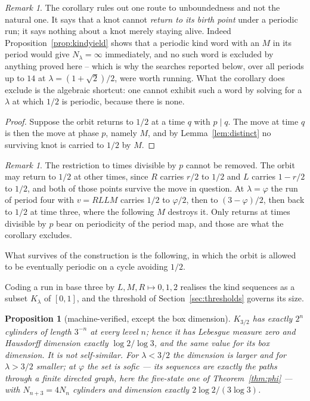 \documentclass[11pt,reqno]{amsart}
\theoremstyle{plain}
\newtheorem{proposition}[theorem]{Proposition}
\theoremstyle{definition}
\theoremstyle{remark}
\newtheorem{remark}[theorem]{Remark}
\begin{document}
\begin{remark}
The corollary rules out one route to unboundedness and not the natural one. It
says that a knot cannot \emph{return to its birth point} under a periodic run;
it says nothing about a knot merely staying alive. Indeed
Proposition~\ref{prop:kindyield} shows that a periodic kind word with an $M$ in
its period would give $N_\lambda=\infty$ immediately, and no such word is
excluded by anything proved here -- which is why the searches reported below,
over all periods up to $14$ at $\lambda=(1+\sqrt2)/2$, were worth running. What
the corollary does exclude is the algebraic shortcut: one cannot exhibit such a
word by solving for a $\lambda$ at which $1/2$ is periodic, because there is
none.
\end{remark}

\begin{proof}
Suppose the orbit returns to $1/2$ at a time $q$ with $p\mid q$. The move at
time $q$ is then the move at phase $p$, namely $M$, and by
Lemma~\ref{lem:distinct} no surviving knot is carried to $1/2$ by $M$.
\end{proof}

\begin{remark}\label{rem:onlymultiples}
The restriction to times divisible by $p$ cannot be removed. The orbit may
return to $1/2$ at other times, since $R$ carries $r/2$ to $1/2$ and $L$ carries
$1-r/2$ to $1/2$, and both of those points survive the move in question. At
$\lambda=\varphi$ the run of period four with $v=RLLM$ carries $1/2$ to
$\varphi/2$, then to $(3-\varphi)/2$, then back to $1/2$ at time three, where
the following $M$ destroys it. Only returns at times divisible by $p$ bear on
periodicity of the period map, and those are what the corollary excludes.
\end{remark}

What survives of the construction is the following, in which the orbit is
allowed to be eventually periodic on a cycle avoiding $1/2$.

Coding a run in base three by $L,M,R\mapsto0,1,2$ realises the kind sequences
as a subset $K_\lambda$ of $[0,1]$, and the threshold of
Section~\ref{sec:thresholds} governs its size.

\begin{proposition}[machine-verified, except the box dimension]\label{prop:kinddim}
$K_{3/2}$ has exactly $2^n$ cylinders of length $3^{-n}$ at every level $n$;
hence it has Lebesgue measure zero and Hausdorff dimension exactly
$\log2/\log3$, and the same value for its box dimension. It is not self-similar. For $\lambda<3/2$ the dimension is
larger and for $\lambda>3/2$ smaller; at $\varphi$ the set is \emph{sofic} ---
its sequences are exactly the paths through a finite directed graph, here the
five-state one of Theorem~\ref{thm:phi} --- with
$N_{n+3}=4N_n$ cylinders and dimension exactly $2\log2/(3\log3)$.
\end{proposition}
\end{document}
